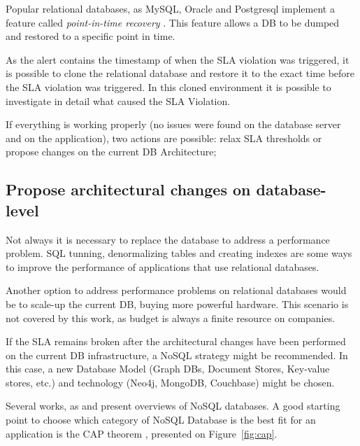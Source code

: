 Popular relational databases, as MySQL, Oracle and Postgresql implement a feature called \textit{point-in-time recovery} \cite{pitrmysql} \cite{pitroracle} \cite{pitrposgres}. This feature allows a DB to be dumped and restored to a specific point in time.

As the alert contains the timestamp of when the SLA violation was triggered, it is possible to clone the relational database and restore it to the exact time before the SLA violation was triggered. In this cloned environment it is possible to investigate in detail what caused the SLA Violation. 

If everything is working properly (no issues were found on the database server and on the application), two actions are possible: relax SLA thresholds or propose changes on the current DB Architecture;

\subsection{Propose architectural changes on database-level} 

Not always it is necessary to replace the database to address a performance problem. SQL tunning, denormalizing tables and creating indexes are some ways to improve the performance of applications that use relational databases.

Another option to address performance problems on relational databases would be to scale-up the current DB, buying more powerful hardware. This scenario is not covered by this work, as budget is always a finite resource on companies.

If the SLA remains broken after the architectural changes have been performed on the current DB infrastructure, a NoSQL strategy might be recommended. In this case, a new Database Model (Graph DBs, Document Stores, Key-value stores, etc.) and technology (Neo4j, MongoDB, Couchbase) might be chosen.

Several works, as \cite{6106531} and \cite{5410700} present overviews of NoSQL databases. A good starting point to choose which category of NoSQL Database is the best fit for an application is the CAP theorem \cite{nosqlthoughtworks}, presented on Figure~\ref{fig:cap}. 

